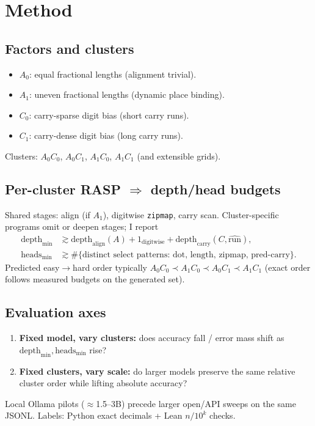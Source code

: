 \documentclass[11pt]{article}
\begin{document}
\section{Method}

\subsection{Factors and clusters}
\begin{itemize}
  \item $A_0$: equal fractional lengths (alignment trivial).
  \item $A_1$: uneven fractional lengths (dynamic place binding).
  \item $C_0$: carry-sparse digit bias (short carry runs).
  \item $C_1$: carry-dense digit bias (long carry runs).
\end{itemize}
Clusters: $A_0C_0$, $A_0C_1$, $A_1C_0$, $A_1C_1$ (and extensible grids).

\subsection{Per-cluster RASP $\Rightarrow$ depth/head budgets}
Shared stages: align (if $A_1$), digitwise \texttt{zipmap}, carry scan.
Cluster-specific programs omit or deepen stages; I report
\begin{align*}
\mathrm{depth}_{\min}
&\gtrsim \mathrm{depth}_{\mathrm{align}}(A)
  + 1_{\mathrm{digitwise}}
  + \mathrm{depth}_{\mathrm{carry}}(C,\widehat{\mathrm{run}}), \\
\mathrm{heads}_{\min}
&\gtrsim \#\{\text{distinct select patterns: dot, length, zipmap, pred-carry}\}.
\end{align*}
Predicted easy$\to$hard order typically $A_0C_0 \prec A_1C_0 \prec A_0C_1 \prec A_1C_1$
(exact order follows measured budgets on the generated set).

\subsection{Evaluation axes}
\begin{enumerate}
  \item \textbf{Fixed model, vary clusters:} does accuracy fall / error mass shift as
        $\mathrm{depth}_{\min},\mathrm{heads}_{\min}$ rise?
  \item \textbf{Fixed clusters, vary scale:} do larger models preserve the same relative
        cluster order while lifting absolute accuracy?
\end{enumerate}
Local Ollama pilots ($\approx$1.5--3B) precede larger open/API sweeps on the same JSONL.
Labels: Python exact decimals + Lean $n/10^k$ checks.
\end{document}
